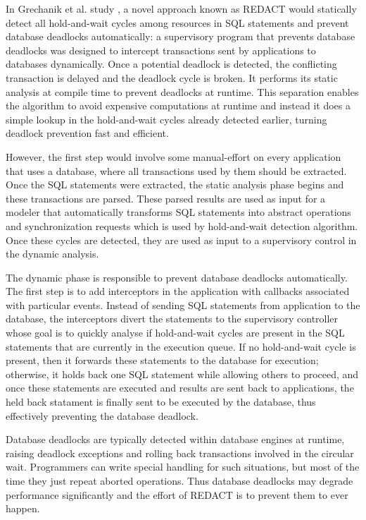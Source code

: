 In Grechanik et al. study \cite{grechanik},
a novel approach known as REDACT would statically detect all hold-and-wait cycles among resources in SQL statements and prevent database deadlocks automatically: a supervisory
program that prevents database deadlocks was designed to intercept transactions sent by applications to databases dynamically. Once a potential deadlock is detected, the
conflicting transaction is delayed and the deadlock cycle is broken. It performs its static analysis at compile time to prevent deadlocks at runtime. This separation enables the algorithm to avoid expensive computations at runtime and instead it does a simple lookup in the hold-and-wait cycles already detected earlier, turning deadlock prevention fast and efficient.

However, the first step would involve some manual-effort on every application that uses a database, where all transactions used by them should be extracted.
Once the SQL statements were extracted, the static analysis phase begins and these transactions are parsed. These parsed results are used as input for a modeler that automatically transforms SQL statements into abstract operations
and synchronization requests which is used by hold-and-wait detection algorithm. Once these cycles are detected, they are used as input to a supervisory control in the dynamic analysis.

The dynamic phase is responsible to prevent database deadlocks automatically. The first step is to add interceptors in the application with callbacks associated with particular events.
Instead of sending SQL statements from application to the database, the interceptors divert the statements to the supervisory controller whose goal is to quickly analyse if
hold-and-wait cycles are present in the SQL statements that are currently in the execution queue. If no hold-and-wait cycle is present, then it forwards these statements to the
database for execution; otherwise, it holds back one SQL statement while allowing others to proceed, and once these statements are executed and results are sent back to applications,
the held back statament is finally sent to be executed by the database, thus effectively preventing the database deadlock.

Database deadlocks are typically detected within database engines at runtime, raising deadlock exceptions and rolling back transactions involved in the circular wait. Programmers
can write special handling for such situations, but most of the time they just repeat aborted operations. Thus database deadlocks may degrade performance significantly and the
effort of REDACT is to prevent them to ever happen.

